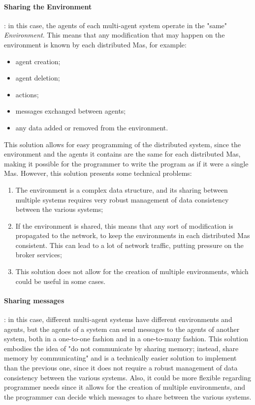 \paragraph{Sharing the Environment}: in this case, the agents of each multi-agent system operate in the "same" \textit{Environment}.
This means that any modification that may happen on the environment is known by each distributed Mas, for example:
\begin{itemize}
    \item agent creation;
    \item agent deletion;
    \item actions;
    \item messages exchanged between agents;
    \item any data added or removed from the environment.
\end{itemize}

This solution allows for easy programming of the distributed system, since the environment and the agents it contains are the same for each distributed Mas, making it possible for the programmer to write the program as if it were a single Mas.
However, this solution presents some technical problems:
\begin{enumerate}
    \item The environment is a complex data structure, and its sharing between multiple systems requires very robust management of data consistency between the various systems;
    \item If the environment is shared, this means that any sort of modification is propagated to the network, to keep the environments in each distributed Mas consistent. This
          can lead to a lot of network traffic, putting pressure on the broker services;
    \item This solution does not allow for the creation of multiple environments, which could be useful in some cases.
\end{enumerate}

\paragraph{Sharing messages}: in this case, different multi-agent systems have different environments and agents, but the agents of a system can send messages to the agents of another system, both in a one-to-one fashion and in a one-to-many fashion.
This solution embodies the idea of "do not communicate by sharing memory; instead, share memory by communicating" and is a technically easier solution to implement than the previous one, since it does not require a robust management of data consistency between the various systems.
Also, it could be more flexible regarding programmer needs since it allows for the creation of multiple environments, and the programmer can decide which messages to share between the various systems.

